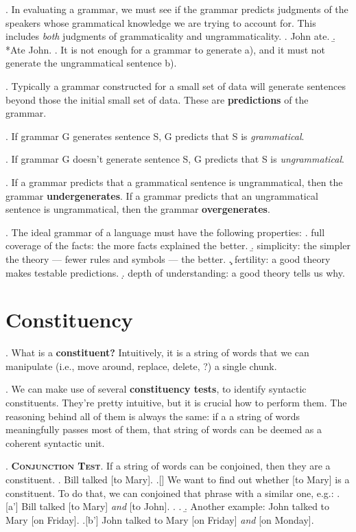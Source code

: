 \documentclass[11pt, oneside]{article}   	%
\begin{document}
\ex. In evaluating a grammar, we must see if the grammar predicts judgments of the speakers whose grammatical knowledge we are trying to account for.  This includes {\em both} judgments of grammaticality and ungrammaticality.
	\a. John ate.
	\b. *Ate John.
	\z.
It is not enough for a grammar to generate a), and it must not generate the ungrammatical sentence b).
	
\ex. Typically a grammar constructed for a small set of data will generate sentences beyond those the initial small set of data.  These are {\bfseries predictions} of the grammar.

\ex. If grammar G generates sentence S, G predicts that S is {\em grammatical}.

\ex. If grammar G doesn't generate sentence S, G predicts that S is {\em ungrammatical}.

\ex. If a grammar predicts that a grammatical sentence is ungrammatical, then the grammar {\bfseries undergenerates}. If a grammar predicts that an ungrammatical sentence is ungrammatical, then the grammar {\bfseries overgenerates}.

\ex. The ideal grammar of a language must have the following properties:
	\a.	full coverage of the facts: the more facts explained the better.
	\b.	simplicity: the simpler the theory --- fewer rules and symbols --- the better.
	\c.	fertility: a good theory makes testable predictions.
	\d.	depth of understanding: a good theory tells us why.

\section{Constituency}

\ex. What is a {\bfseries constituent?} Intuitively, it is a string of words that we can manipulate (i.e., move around, replace, delete, ?) a single chunk. 

\ex. We can make use of several {\bfseries constituency tests}, to identify syntactic constituents. They're pretty intuitive, but it is crucial how to perform them. The reasoning behind all of them is always the same: if a a string of words meaningfully passes most of them, that string of words can be deemed as a coherent syntactic unit.

\ex. {\bfseries \scshape Conjunction Test}. If a string of words can be conjoined, then they are a constituent.
	\a. Bill talked [to Mary]. 
		\a.[] We want to find out whether [to Mary] is a constituent. To do that, we can conjoined that phrase with a similar one, e.g.:
			\a.[a'] Bill talked [to Mary] {\em and} [to John].
			\z.
		\z.
	\b. Another example: John talked to Mary [on Friday].
		\a.[b'] John talked to Mary [on Friday] {\em and} [on Monday].
\end{document}
